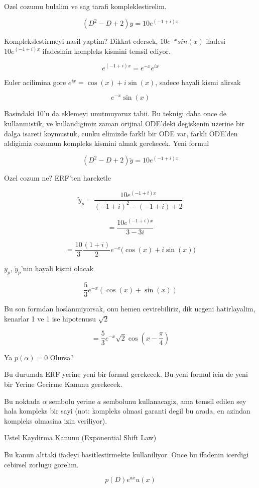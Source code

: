 \documentclass[12pt,fleqn]{article}\usepackage{../common}
\begin{document}
Ozel cozumu bulalim ve sag tarafi kompleklestirelim. 

\[ (D^2 - D + 2)y = 10 e ^{(-1 + i)x} \]

Komplekslestirmeyi nasil yaptim? Dikkat edersek, $10e^{-x}sin(x)$ ifadesi
$10 e^{(-1 + i)x}$ ifadesinin kompleks kismini temsil ediyor. 

\[ e ^{(-1 + i)x} = e^{-x} e^{ix} \]

Euler acilimina gore $e^{ix} = \cos(x) + i\sin(x)$, sadece hayali kismi alirsak

\[ e^{-x} \sin(x)  \]

Basindaki 10'u da eklemeyi unutmuyoruz tabii. Bu teknigi daha once de
kullanmistik, ve kullandigimiz zaman orijinal ODE'deki degiskenin uzerine
bir dalga isareti koymustuk, cunku elimizde farkli bir ODE var, farkli
ODE'den aldigimiz cozumun kompleks kismini almak gerekecek. Yeni formul

\[ (D^2 - D + 2)\tilde{y} = 10 e ^{(-1 + i)x} \]

Ozel cozum ne? ERF'ten hareketle

\[ \tilde{y}_p = \frac{10 e^{(-1+i)x}}{(-1+i)^2 - (-1+i) + 2} \]

\[  = \frac{10 e^{(-1+i)x}}{3 - 3i} \]

\[ = \frac{10}{3}\frac{(1+i)}{2} e^{-x} \bigg( \cos(x) + i\sin(x) \bigg)\]

$y_p$, $\tilde{y}_p$'nin hayali kismi olacak

\[ \frac{5}{3}e^{-x}( \cos(x) + \sin(x)) \]

Bu son formdan hoslanmiyorsak, onu hemen cevirebiliriz, dik ucgeni
hatirlayalim, kenarlar 1 ve 1 ise hipotenusu $\sqrt{2}$

\[ = \frac{5}{3}e^{-x} \sqrt{2}\cos(x - \frac{\pi}{4})\]

Ya $p(\alpha) = 0$ Olursa?

Bu durumda ERF yerine yeni bir formul gerekecek. Bu yeni formul icin de
yeni bir Yerine Gecirme Kanunu gerekecek. 

Bu noktada $\alpha$ sembolu yerine $a$ sembolunu kullanacagiz, ama temsil
edilen sey hala kompleks bir sayi (not: kompleks olmasi garanti degil bu
arada, en azindan kompleks olmasina izin veriliyor). 

Ustel Kaydirma Kanunu (Exponential Shift Law)

Bu kanun alttaki ifadeyi basitlestirmekte kullaniliyor. Once bu ifadenin
icerdigi cebirsel zorlugu gorelim.

\[ p(D)e^{ax}u(x) \]
\end{document}
